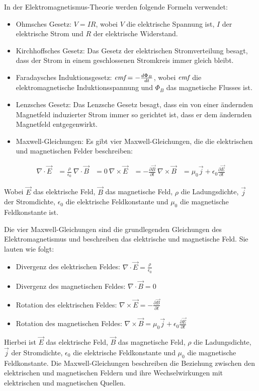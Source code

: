 \documentclass[a4paper]{report}
\begin{document}
In der Elektromagnetismus-Theorie werden folgende Formeln verwendet:
\begin{itemize}
  \item Ohmsches Gesetz: $V = IR$, wobei $V$ die elektrische Spannung ist, $I$ der elektrische Strom und $R$ der elektrische Widerstand.
  \item Kirchhoffsches Gesetz: Das Gesetz der elektrischen Stromverteilung besagt, dass der Strom in einem geschlossenen Stromkreis immer gleich bleibt. 
  \item Faradaysches Induktionsgesetz: $\emph{emf} = -\frac{d\Phi_B}{dt}$, wobei $\emph{emf}$ die elektromagnetische Induktionsspannung und $\Phi_B$ das magnetische Flusses ist. 
  \item Lenzsches Gesetz: Das Lenzsche Gesetz besagt, dass ein von einer ändernden Magnetfeld induzierter Strom immer so gerichtet ist, dass er dem ändernden Magnetfeld entgegenwirkt. 
  \item Maxwell-Gleichungen: Es gibt vier Maxwell-Gleichungen, die die elektrischen und magnetischen Felder beschreiben:
\end{itemize}

\begin{align} \nabla \cdot \vec{E} &= \frac{\rho}{\epsilon_0} \ \nabla \cdot
  \vec{B} &= 0 \ \nabla \times \vec{E} &= -\frac{\partial \vec{B}}{\partial t}
  \ \nabla \times \vec{B} &= \mu_0 \vec{j} + \epsilon_0 \frac{\partial
  \vec{E}}{\partial t}
\end{align}

  Wobei $\vec{E}$ das elektrische Feld, $\vec{B}$ das magnetische Feld, $\rho$
  die Ladungsdichte, $\vec{j}$ der Stromdichte, $\epsilon_0$ die elektrische
  Feldkonstante und $\mu_0$ die magnetische Feldkonstante ist.

  Die vier Maxwell-Gleichungen sind die grundlegenden Gleichungen des
  Elektromagnetismus und beschreiben das elektrische und magnetische Feld. Sie
  lauten wie folgt: 
\begin{itemize} 
\item Divergenz des elektrischen Feldes: $\nabla \cdot \vec{E} = \frac{\rho}{\epsilon_0}$ 
\item Divergenz des magnetischen Feldes: $\nabla \cdot \vec{B} = 0$ 
\item Rotation des elektrischen Feldes: $\nabla \times \vec{E} = -\frac{\partial \vec{B}}{\partial t}$ 
\item Rotation des magnetischen Feldes: $\nabla \times \vec{B} = \mu_0 \vec{j} + \epsilon_0 \frac{\partial \vec{E}}{\partial t}$ 
\end{itemize}
Hierbei ist $\vec{E}$ das elektrische Feld, $\vec{B}$ das magnetische Feld,
$\rho$ die Ladungsdichte, $\vec{j}$ der Stromdichte, $\epsilon_0$ die
elektrische Feldkonstante und $\mu_0$ die magnetische Feldkonstante. Die
Maxwell-Gleichungen beschreiben die Beziehung zwischen den elektrischen und
magnetischen Feldern und ihre Wechselwirkungen mit elektrischen und
magnetischen Quellen.
\end{document}
